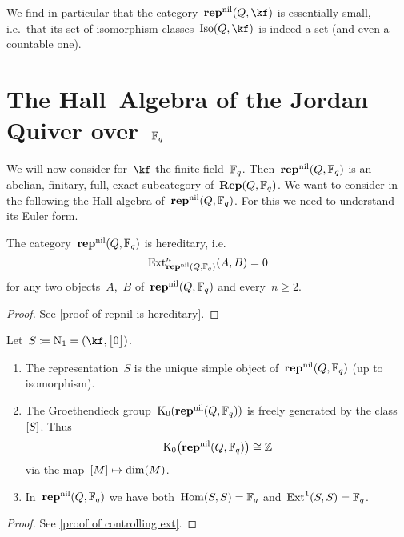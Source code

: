 \documentclass[a4paper,11pt]{scrartcl}
\begin{document}
We find in particular that the category~$\repnil(Q, \kf)$ is essentially small, i.e.\ that its set of isomorphism classes~$\Iso(Q, \kf)$ is indeed a set (and even a countable one).




\section{The Hall~Algebra of the Jordan Quiver over~$\mathbb{F}_q$}

We will now consider for~$\kf$ the finite field~$\mathbb{F}_q$.
Then~$\mathbf{rep}^{\mathrm{nil}}(Q, \mathbb{F}_q)$ is an abelian, finitary, full, exact subcategory of~$\mathbf{Rep}(Q, \mathbb{F}_q)$.
We want to consider in the following the Hall algebra of~$\mathbf{rep}^{\mathrm{nil}}(Q, \mathbb{F}_q)$.
For this we need to understand its Euler form.

\begin{proposition}
  \label{repnil is hereditary}
  The category~$\mathbf{rep}^{\mathrm{nil}}(Q, \mathbb{F}_q)$ is hereditary, i.e.
  \[
    \operatorname{Ext}^n_{\mathbf{rep}^{\mathrm{nil}}(Q, \mathbb{F}_q)}(A,B)
    =
    0
  \]
  for any two objects~$A$,~$B$ of~$\mathbf{rep}^{\mathrm{nil}}(Q, \mathbb{F}_q)$ and every~$n \geq 2$.
\end{proposition}

\begin{proof}
  See \cref{proof of repnil is hereditary}.
\end{proof}

\begin{lemma}
  \label{controlling ext}
  Let~$S \defined \Nil_1 = (\kf, \begin{bmatrix} 0 \end{bmatrix})$.
  \begin{enumerate}
    \item
      The representation~$S$ is the unique simple object of~$\mathbf{rep}^{\mathrm{nil}}(Q, \mathbb{F}_q)$ (up to isomorphism).
    \item
      The Groethendieck group~$\operatorname{K}_0(\mathbf{rep}^{\mathrm{nil}}(Q, \mathbb{F}_q))$ is freely generated by the class~$[S]$.
      Thus
      \[
        \operatorname{K}_0\bigl( \mathbf{rep}^{\mathrm{nil}}(Q, \mathbb{F}_q) \bigr)
        \cong
        \mathbb{Z}
      \]
      via the map~$[M] \mapsto \dim(M)$.
    \item
      In~$\mathbf{rep}^{\mathrm{nil}}(Q, \mathbb{F}_q)$ we have both~$\operatorname{Hom}(S, S) = \mathbb{F}_q$ and~$\operatorname{Ext}^1(S,S) = \mathbb{F}_q$.
  \end{enumerate}
\end{lemma}

\begin{proof}
  See \cref{proof of controlling ext}.
\end{proof}
\end{document}
